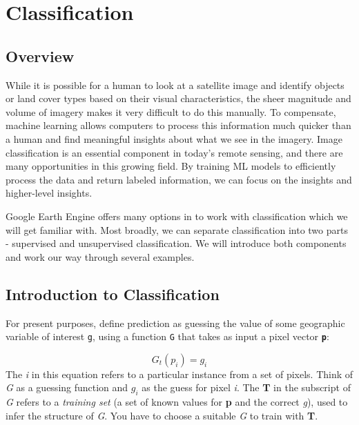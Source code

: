\documentclass[
]{article}
\begin{document}
\hypertarget{classification}{%
\section{Classification}\label{classification}}

\hypertarget{overview-4}{%
\subsection*{Overview}\label{overview-4}}

While it is possible for a human to look at a satellite image and identify objects or land cover types based on their visual characteristics, the sheer magnitude and volume of imagery makes it very difficult to do this manually. To compensate, machine learning allows computers to process this information much quicker than a human and find meaningful insights about what we see in the imagery. Image classification is an essential component in today's remote sensing, and there are many opportunities in this growing field. By training ML models to efficiently process the data and return labeled information, we can focus on the insights and higher-level insights.

Google Earth Engine offers many options in to work with classification which we will get familiar with. Most broadly, we can separate classification into two parts - supervised and unsupervised classification. We will introduce both components and work our way through several examples.

\hypertarget{introduction-to-classification}{%
\subsection{Introduction to Classification}\label{introduction-to-classification}}

For present purposes, define prediction as guessing the value of some geographic variable of interest \texttt{g}, using a function \texttt{G} that takes as input a pixel vector \textbf{\texttt{p}}:

\[
G_{t}(p_{i}) = g_{i}
\]
The \emph{i} in this equation refers to a particular instance from a set of pixels. Think of \emph{G} as a guessing function and \(g_{i}\) as the guess for pixel \emph{i}. The \textbf{T} in the subscript of \emph{G} refers to a \emph{training set} (a set of known values for \textbf{p} and the correct \emph{g}), used to infer the structure of \emph{G}. You have to choose a suitable \emph{G} to train with \textbf{T}.
\end{document}
